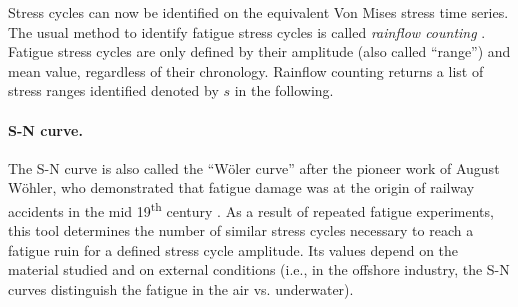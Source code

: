 Stress cycles can now be identified on the equivalent Von Mises stress time series. 
The usual method to identify fatigue stress cycles is called \textit{rainflow counting} \citep{dowling_1972}. 
Fatigue stress cycles are only defined by their amplitude (also called ``range'') and mean value, regardless of their chronology. 
Rainflow counting returns a list of stress ranges identified denoted by $s$ in the following. 


\paragraph{S-N curve.}
The S-N curve is also called the ``W\"oler curve'' after the pioneer work of August W\"ohler, who demonstrated that fatigue damage was at the origin of railway accidents in the mid 19\textsuperscript{th} century \citep{schutz_1996_history_fatigue}. 
As a result of repeated fatigue experiments, this tool determines the number of similar stress cycles necessary to reach a fatigue ruin for a defined stress cycle amplitude. 
Its values depend on the material studied and on external conditions (i.e., in the offshore industry, the S-N curves distinguish the fatigue in the air vs. underwater). 

